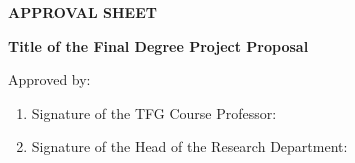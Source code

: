 \begin{center}
	\textbf{APPROVAL SHEET}

	\vspace{0.5cm}
	\textbf{Title of the Final Degree Project Proposal}
\end{center}

\vspace{2cm}
Approved by:
\vspace{1cm}

\begin{enumerate}
	\item Signature of the TFG Course Professor: \underline{\hspace{6cm}} \\
	
	
	\vspace{1cm}
	
	\item Signature of the Head of the Research Department: \underline{\hspace{3.5cm}} \\
	
	
\end{enumerate}
